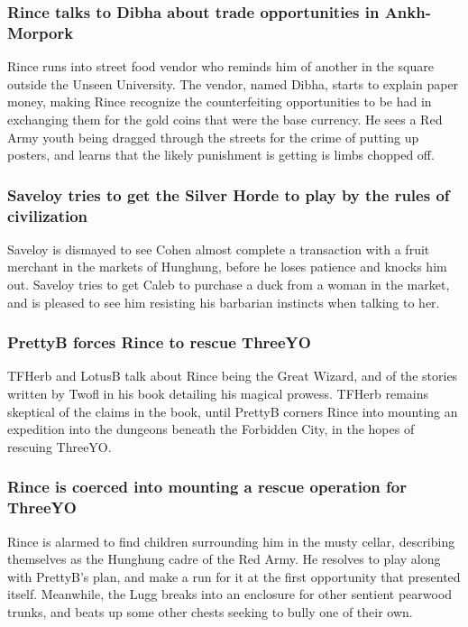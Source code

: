 \subsubsection{\Gls{Rince} talks to \Gls{Dibha} about trade opportunities in Ankh-Morpork}
\Gls{Rince} runs into street food vendor who reminds him of another in the square outside the
Unseen University. The vendor, named \Gls{Dibha}, starts to explain paper money, making \Gls{Rince}
recognize the counterfeiting opportunities to be had in exchanging them for the gold coins that were
the base currency. He sees a Red Army youth being dragged through the streets for the crime of
putting up posters, and learns that the likely punishment is getting is limbs chopped off.

\subsubsection{\Gls{Saveloy} tries to get the Silver Horde to play by the rules of civilization}
\Gls{Saveloy} is dismayed to see \Gls{Cohen} almost complete a transaction with a fruit merchant in
the markets of Hunghung, before he loses patience and knocks him out. \Gls{Saveloy} tries to get
\Gls{Caleb} to purchase a duck from a woman in the market, and is pleased to see him resisting
his barbarian instincts when talking to her.

\subsubsection{\Gls{PrettyB} forces \Gls{Rince} to rescue \Gls{ThreeYO}}
\Gls{TFHerb} and \Gls{LotusB} talk about \Gls{Rince} being the Great Wizard, and of the stories
written by \Gls{Twofl} in his book detailing his magical prowess. \Gls{TFHerb} remains skeptical of
the claims in the book, until \Gls{PrettyB} corners \Gls{Rince} into mounting an expedition into
the dungeons beneath the Forbidden City, in the hopes of rescuing \Gls{ThreeYO}.

\subsubsection{\Gls{Rince} is coerced into mounting a rescue operation for \Gls{ThreeYO}}
\Gls{Rince} is alarmed to find children surrounding him in the musty cellar, describing themselves
as the Hunghung cadre of the Red Army. He resolves to play along with \Gls{PrettyB}'s plan, and
make a run for it at the first opportunity that presented itself. Meanwhile, the \Gls{Lugg} breaks
into an enclosure for other sentient pearwood trunks, and beats up some other chests seeking to
bully one of their own.

